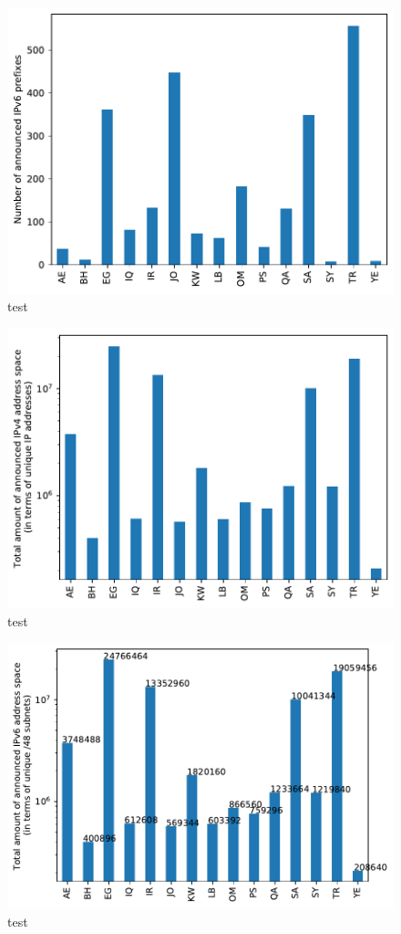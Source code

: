 \documentclass[a4paper,titlepage]{article}
\begin{document}
\begin{figure}
    \centering
    \includegraphics[width=0.8\linewidth]{../output/prefix-v6.pdf}
    \caption{test}
\end{figure}

\begin{figure}
    \centering
    \includegraphics[width=0.8\linewidth]{../output/ips-v4.pdf}
    \caption{test}
\end{figure}

\begin{figure}
    \centering
    \includegraphics[width=0.8\linewidth]{../output/48s-v6.pdf}
    \caption{test}
\end{figure}
\end{document}
